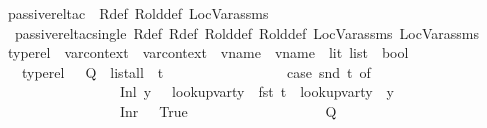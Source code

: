 \begin{isabellebody}
\isanewline
{}\isamarkupfalse%
\ passive{\isacharunderscore}{\kern0pt}rel{\isacharunderscore}{\kern0pt}tac\ \ R{\isacharunderscore}{\kern0pt}def\ R{\isacharunderscore}{\kern0pt}old{\isacharunderscore}{\kern0pt}def\ LocVar{\isacharunderscore}{\kern0pt}assms\ {\isacharequal}{\kern0pt}\ \isanewline
\ \ {\isacharparenleft}{\kern0pt}passive{\isacharunderscore}{\kern0pt}rel{\isacharunderscore}{\kern0pt}tac{\isacharunderscore}{\kern0pt}single\ R{\isacharunderscore}{\kern0pt}def{\isacharcolon}{\kern0pt}\ R{\isacharunderscore}{\kern0pt}def\ R{\isacharunderscore}{\kern0pt}old{\isacharunderscore}{\kern0pt}def{\isacharcolon}{\kern0pt}\ R{\isacharunderscore}{\kern0pt}old{\isacharunderscore}{\kern0pt}def\ LocVar{\isacharunderscore}{\kern0pt}assms{\isacharcolon}{\kern0pt}\ LocVar{\isacharunderscore}{\kern0pt}assms{\isacharparenright}{\kern0pt}{\isacharplus}{\kern0pt}\isanewline
\isanewline
{}\isamarkupfalse%
\ type{\isacharunderscore}{\kern0pt}rel\ {\isacharcolon}{\kern0pt}{\isacharcolon}{\kern0pt}\ {\isachardoublequoteopen}var{\isacharunderscore}{\kern0pt}context\ {\isasymRightarrow}\ var{\isacharunderscore}{\kern0pt}context\ {\isasymRightarrow}\ {\isacharparenleft}{\kern0pt}vname\ {\isasymtimes}\ {\isacharparenleft}{\kern0pt}vname\ {\isacharplus}{\kern0pt}\ lit{\isacharparenright}{\kern0pt}{\isacharparenright}{\kern0pt}\ list\ {\isasymRightarrow}\ bool{\isachardoublequoteclose}\isanewline
\ \ \ {\isachardoublequoteopen}type{\isacharunderscore}{\kern0pt}rel\ {\isasymLambda}\ {\isasymLambda}{\isacharprime}{\kern0pt}\ Q\ {\isacharequal}{\kern0pt}\ list{\isacharunderscore}{\kern0pt}all\ {\isacharparenleft}{\kern0pt}{\isasymlambda}\ t{\isachardot}{\kern0pt}\ \isanewline
\ \ \ \ \ \ \ \ \ \ \ \ \ \ \ \ case\ {\isacharparenleft}{\kern0pt}snd\ t{\isacharparenright}{\kern0pt}\ of\isanewline
\ \ \ \ \ \ \ \ \ \ \ \ \ \ \ \ \ {\isacharparenleft}{\kern0pt}Inl\ y{\isacharparenright}{\kern0pt}\ {\isasymRightarrow}\ \ lookup{\isacharunderscore}{\kern0pt}var{\isacharunderscore}{\kern0pt}ty\ {\isasymLambda}\ {\isacharparenleft}{\kern0pt}fst\ t{\isacharparenright}{\kern0pt}\ {\isacharequal}{\kern0pt}\ lookup{\isacharunderscore}{\kern0pt}var{\isacharunderscore}{\kern0pt}ty\ {\isasymLambda}{\isacharprime}{\kern0pt}\ y\ \isanewline
\ \ \ \ \ \ \ \ \ \ \ \ \ \ \ \ {\isacharbar}{\kern0pt}\ {\isacharparenleft}{\kern0pt}Inr\ {\isacharunderscore}{\kern0pt}{\isacharparenright}{\kern0pt}\ {\isasymRightarrow}\ True\isanewline
\ \ \ \ \ \ \ \ \ \ \ \ \ \ \ \ \ \ {\isacharparenright}{\kern0pt}\ Q{\isachardoublequoteclose}\isanewline

\end{isabellebody}

